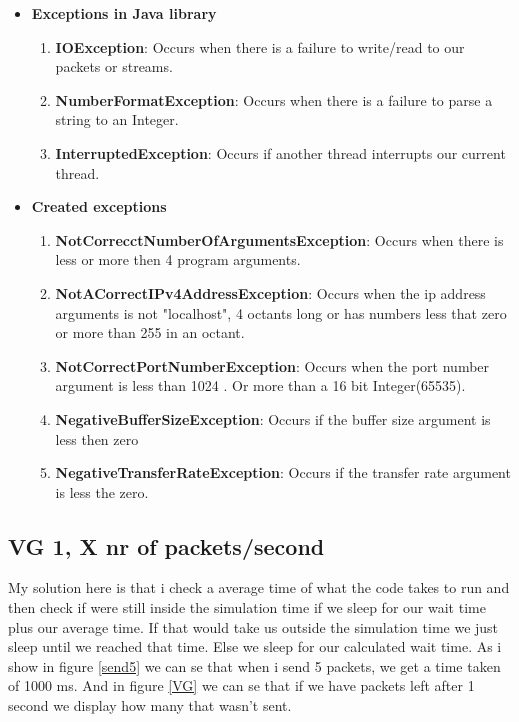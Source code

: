 \documentclass[a4paper,12pt]{article}
\numberwithin{figure}{section}
\begin{document}
\begin{itemize}
	\item \textbf{Exceptions in Java library}
	\begin{enumerate}
		\item\textbf{IOException}: Occurs when there is a failure to write/read to our packets or streams.
		\item \textbf{NumberFormatException}: Occurs when there is a failure to parse a string to an Integer.
		\item \textbf{InterruptedException}: Occurs if another thread interrupts our current thread.
	\end{enumerate}
	\item \textbf{Created exceptions}
		\begin{enumerate}
			\item\textbf{NotCorrecctNumberOfArgumentsException}: Occurs when there is less or more then 4 program arguments.
			\item \textbf{NotACorrectIPv4AddressException}: Occurs when the ip address arguments is not "localhost", 4 octants long or has numbers less that zero or more than 255 in an octant.
			\item \textbf{NotCorrectPortNumberException}: Occurs when the port number argument is less than 1024 \cite{portNumbers}. Or more than a 16 bit Integer(65535).
			\item \textbf{ NegativeBufferSizeException}: Occurs if the buffer size argument is less then zero
			\item \textbf{NegativeTransferRateException}: Occurs if the transfer rate argument is less the zero.
		\end{enumerate}
\end{itemize}

\subsection{VG 1, X nr of packets/second}

My solution here is that i check a average time of what the code takes to run and then check if were still inside the simulation time if we sleep for our wait time plus our average time. If that would take us outside the simulation time we just sleep until we reached that time. Else we sleep for our calculated wait time.
As i show in figure \ref{send5} we can se that when i send 5 packets, we get a time taken of 1000 ms. And in figure \ref{VG} we can se that if we have packets left after 1 second we display how many that wasn't sent.
\end{document}
